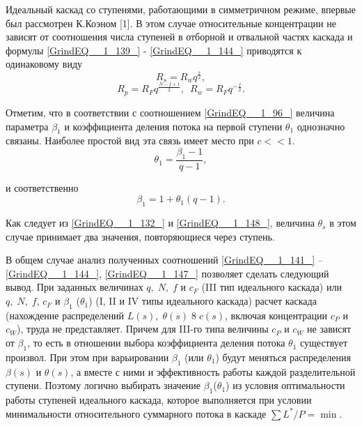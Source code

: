 Идеальный каскад со ступенями, работающими в симметричном режиме, впервые был рассмотрен К.Коэном [1]. В этом случае относительные концентрации не зависят от соотношения числа ступеней в отборной и отвальной частях каскада и формулы \ref{GrindEQ__1_139_} - \ref{GrindEQ__1_144_} приводятся к одинаковому виду
\begin{equation} \label{GrindEQ__1_146_} 
R_{s} =R_{w} q^{\frac{s}{2} } ,                                      
\end{equation} 
\begin{equation} \label{GrindEQ__1_147_} 
R_{p} =R_{F} q^{\frac{N-f+1}{2} } ,\, \, \, R_{w} =R_{F} q^{-\frac{f}{2} } .                
\end{equation} 

Отметим, что в соответствии с соотношением \ref{GrindEQ__1_96_} величина параметра $\beta _{1} $ и коэффициента деления потока на первой ступени $\theta _{1} $ однозначно связаны. Наиболее простой вид эта связь имеет место при $c<<1$.
\begin{equation} \label{GrindEQ__1_148_} 
\theta _{1} =\frac{\beta _{1} -1}{q-1} ,                                     
\end{equation} 

и соответственно
\begin{equation} \label{GrindEQ__1_149_} 
\beta _{1} =1+\theta _{1} (q-1).                           
\end{equation} 

Как следует из \ref{GrindEQ__1_132_} и \ref{GrindEQ__1_148_}, величина $\theta _{s} $ в этом случае принимает два значения, повторяющиеся через ступень.

В общем случае анализ полученных соотношений \ref{GrindEQ__1_141_} -- \ref{GrindEQ__1_144_}, \ref{GrindEQ__1_147_} позволяет сделать следующий вывод. При заданных величинах $q,\; N,\; f$ и $c_{F} $ (III тип идеального каскада) или $q,\; N,\; f$, $c_{F} $ и $\beta _{1} $ ($\theta _{1} $) (I, II и IV типы идеального каскада) расчет каскада (нахождение распределений $L(s),\; \theta (s)\; 8\; c(s)$, включая концентрации $c_{P} $ и $c_{W} $), труда не представляет. Причем для III-го типа величины $c_{P} $ и $c_{W} $ не зависят от $\beta _{1} $, то есть в отношении выбора коэффициента деления потока $\theta _{1} $ существует произвол. При этом при варьировании $\beta _{1} $ (или $\theta _{1} $) будут меняться распределения $\beta (s)$ и $\theta (s)$, а вместе с ними и эффективность работы каждой разделительной ступени. Поэтому логично выбирать значение $\beta _{1} $($\theta _{1} $) из условия оптимальности работы ступеней идеального каскада, которое выполняется при условии минимальности относительного суммарного потока в каскаде $\sum L^{*} /P=\min  $.

